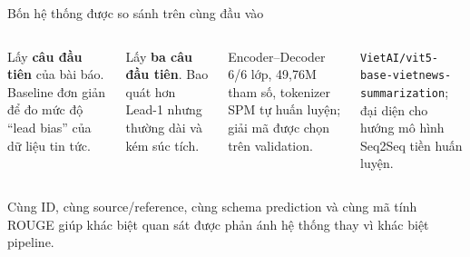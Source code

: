\documentclass[aspectratio=169,10pt]{beamer}
\begin{document}
\begin{frame}{Bốn hệ thống được so sánh trên cùng đầu vào}
  \begin{columns}[T,onlytextwidth]
      \begin{tcolorbox}[title=Lead-1,colback=white,colframe=gray!65,colbacktitle=gray!65,coltitle=white,fonttitle=\bfseries,left=2mm,right=2mm,top=1mm,bottom=1mm]
        \footnotesize Lấy \textbf{câu đầu tiên} của bài báo. Baseline đơn giản để đo mức độ “lead bias” của dữ liệu tin tức.
      \end{tcolorbox}
      \vspace{1mm}
      \begin{tcolorbox}[title=Lead-3,colback=white,colframe=MidBlue,colbacktitle=MidBlue,coltitle=white,fonttitle=\bfseries,left=2mm,right=2mm,top=1mm,bottom=1mm]
        \footnotesize Lấy \textbf{ba câu đầu tiên}. Bao quát hơn Lead-1 nhưng thường dài và kém súc tích.
      \end{tcolorbox}
      \begin{tcolorbox}[title=Scratch Transformer,colback=SoftBlue,colframe=DeepBlue,colbacktitle=DeepBlue,coltitle=white,fonttitle=\bfseries,left=2mm,right=2mm,top=1mm,bottom=1mm]
        \footnotesize Encoder--Decoder 6/6 lớp, 49,76M tham số, tokenizer SPM tự huấn luyện; giải mã được chọn trên validation.
      \end{tcolorbox}
      \vspace{1mm}
      \begin{tcolorbox}[title=ViT5-Base,colback=white,colframe=VitPurple,colbacktitle=VitPurple,coltitle=white,fonttitle=\bfseries,left=2mm,right=2mm,top=1mm,bottom=1mm]
        \footnotesize \texttt{VietAI/vit5-base-}\allowbreak\texttt{vietnews-summarization}; đại diện cho hướng mô hình Seq2Seq tiền huấn luyện.
      \end{tcolorbox}
  \end{columns}
  \vspace{0.12cm}
  \begin{keymessage}
    Cùng ID, cùng source/reference, cùng schema prediction và cùng mã tính ROUGE giúp khác biệt quan sát được phản ánh hệ thống thay vì khác biệt pipeline.
  \end{keymessage}
\end{frame}
\end{document}
